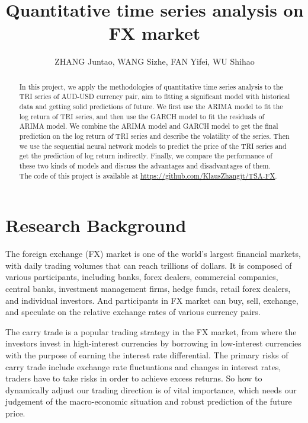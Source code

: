 \documentclass[runningheads]{llncs}
\begin{document}
\title{Quantitative time series analysis on FX market}
\author{ZHANG Juntao, WANG Sizhe, FAN Yifei, WU Shihao}
\maketitle

\begin{abstract}
    In this project, we apply the methodologies of quantitative time series analysis to the TRI series of AUD-USD currency pair, aim to fitting a significant model with historical data and getting solid predictions of future. 
    We first use the ARIMA model to fit the log return of TRI series, and then use the GARCH model to fit the residuals of ARIMA model. 
    We combine the ARIMA model and GARCH model to get the final prediction on the log return of TRI series and describe the volatility of the series. 
    Then we use the sequential neural network models to predict the price of the TRI series and get the prediction of log return indirectly. 
    Finally, we compare the performance of these two kinds of models and discuss the advantages and disadvantages of them.\\
    The code of this project is available at \url{https://github.com/KlausZhangjt/TSA-FX}.
\end{abstract}

\section{Research Background}

The foreign exchange (FX) market is one of the world's largest financial markets, with daily trading volumes that can reach trillions of dollars. It is composed of various participants, including banks, forex dealers, commercial companies, central banks, investment management firms, hedge funds, retail forex dealers, and individual investors. And participants in FX market can buy, sell, exchange, and speculate on the relative exchange rates of various currency pairs.

The carry trade is a popular trading strategy in the FX market\cite{heath2007evidence}, from where the investors invest in high-interest currencies by borrowing in low-interest currencies with the purpose of earning the interest rate differential. The primary risks of carry trade include exchange rate fluctuations and changes in interest rates, traders have to take risks in order to achieve excess returns. So how to dynamically adjust our trading direction is of vital importance\cite{cenedese2014foreign}, which needs our judgement of the macro-economic situation and robust prediction of the future price.
\end{document}
